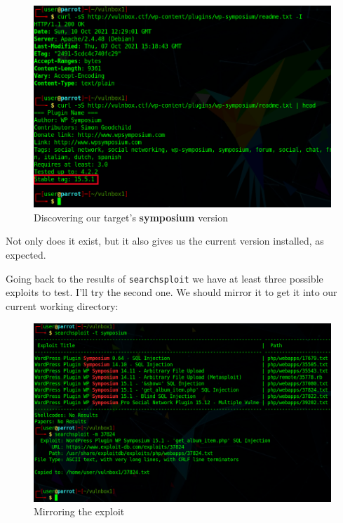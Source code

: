 \documentclass[12pt]{article}
\begin{document}
    \begin{figure}[H]\label{pic:21-curl-symposium-version}
        \centering
        \includegraphics[width=1.00\textwidth]{21-curl-symposium-version-gimp.png}
        \caption{Discovering our target's \textbf{symposium} version}
    \end{figure}

    Not only does it exist, but it also gives us the current version installed,
    as expected.

    Going back to the results of \texttt{searchsploit} we have at least three
    possible exploits to test. I'll try the second one. We should mirror it to
    get it into our current working directory:

    \begin{figure}[H]\label{pic:22-searchsploit-mirror}
        \centering
        \includegraphics[width=1.00\textwidth]{22-searchsploit-mirror.png}
        \caption{Mirroring the exploit}
    \end{figure}
\end{document}
